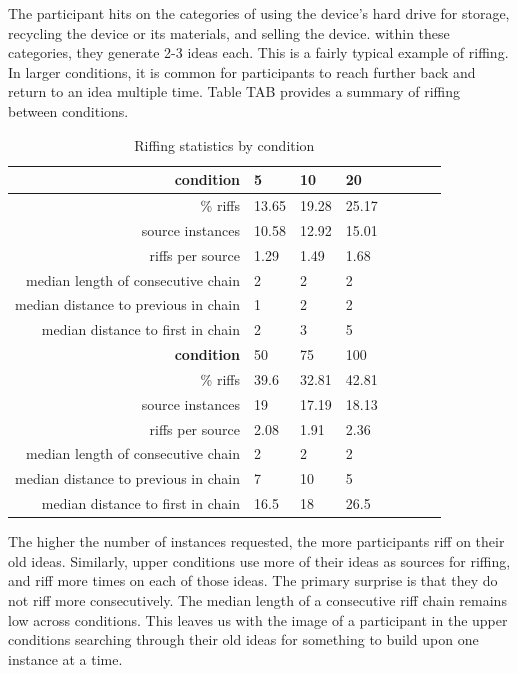 The participant hits on the categories of using the device's hard drive for storage, recycling the device or its materials, and selling the device.  within these categories, they generate 2-3 ideas each. This is a fairly typical example of riffing. In larger conditions, it is common for participants to reach further back and return to an idea multiple time. Table TAB provides a summary of riffing between conditions.

\begin{table}
\begin{tabular}[h!]{r | l l l l l l l}
    \hline \hline \textbf{condition} & 5 & 10 & 20  \\ \hline \hline
    \% riffs & 13.65 & 19.28 & 25.17  \\
    source instances & 10.58 & 12.92 & 15.01 \\
    riffs per source & 1.29 & 1.49 & 1.68 \\
    median length of consecutive chain & 2 & 2 & 2 \\
    median distance to previous in chain & 1 & 2 & 2 \\
    median distance to first in chain & 2 & 3 & 5 \\ \hline \hline
    \textbf{condition} & 50 & 75 & 100 \\ \hline \hline
    \% riffs & 39.6 & 32.81 & 42.81 \\
    source instances & 19 & 17.19 & 18.13\\
    riffs per source & 2.08 & 1.91 & 2.36\\
    median length of consecutive chain & 2 & 2 & 2\\
    median distance to previous in chain & 7 & 10 & 5\\
    median distance to first in chain & 16.5 & 18 & 26.5 \\
    \end{tabular}
    \caption{Riffing statistics by condition}
\end{table}

The higher the number of instances requested, the more participants riff on their old ideas. Similarly, upper conditions use more of their ideas as sources for riffing, and riff more times on each of those ideas. The primary surprise is that they do not riff more consecutively. The median length of a consecutive riff chain remains low across conditions. This leaves us with the image of a participant in the upper conditions searching through their old ideas for something to build upon one instance at a time.

